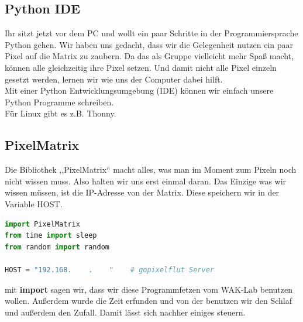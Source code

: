 \subsection{\large{Python IDE}}
Ihr sitzt jetzt vor dem PC und wollt ein paar Schritte in der Programmiersprache Python gehen. Wir haben uns gedacht, dass wir die Gelegenheit nutzen ein paar Pixel auf die Matrix zu zaubern. Da das als Gruppe vielleicht mehr Spaß macht, können alle gleichzeitig ihre Pixel setzen. Und damit nicht alle Pixel einzeln gesetzt werden, lernen wir wie uns der Computer dabei hilft.\\
Mit einer Python Entwicklungsumgebung (IDE) können wir einfach unsere Python Programme schreiben.\\ Für Linux gibt es z.B. Thonny.\\
\subsection{\large{PixelMatrix}}
Die Bibliothek ,,PixelMatrix`` macht alles, was man im Moment zum Pixeln noch nicht wissen muss. Also halten wir uns erst einmal daran. Das Einzige was wir wissen müssen, ist die IP-Adresse von der Matrix. Diese speichern wir in der Variable HOST.\\
\begin{lstlisting}[language=Python, caption=Bibliotheken]
import PixelMatrix
from time import sleep
from random import random

HOST = "192.168.    .    "    # gopixelflut Server 
\end{lstlisting}
mit \textbf{import} sagen wir, dass wir diese Programmfetzen vom WAK-Lab benutzen wollen. Außerdem wurde die Zeit erfunden und von der benutzen wir den Schlaf und außerdem den Zufall. Damit lässt sich nachher einiges steuern.
